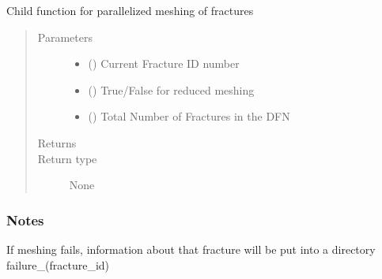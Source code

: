 \documentclass[letterpaper,10pt,english]{sphinxmanual}
\begin{document}
\begin{fulllineitems}
\label{\detokenize{pydfnworks:pydfnworks.dfnGen.run_meshing.mesh_fracture}}
Child function for parallelized meshing of fractures
\begin{quote}\begin{description}
\item[{Parameters}] \leavevmode\begin{itemize}
\item {} 
 () \textendash{} Current Fracture ID number

\item {} 
 () \textendash{} True/False for reduced meshing

\item {} 
 () \textendash{} Total Number of Fractures in the DFN

\end{itemize}

\item[{Returns}] \leavevmode


\item[{Return type}] \leavevmode
None

\end{description}\end{quote}
\subsubsection*{Notes}

If meshing fails, information about that fracture will be put into a directory failure\_(fracture\_id)

\end{fulllineitems}

\end{document}
